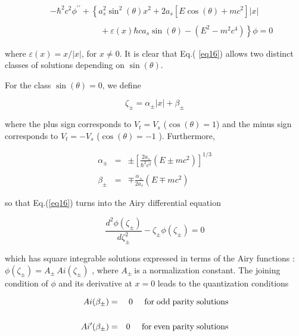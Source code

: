 \documentclass[a4paper,12pt,titlepage]{article}
\begin{document}
\smallskip

\begin{eqnarray}
&&-\hbar ^{2}c^{2}\phi ^{\prime \prime }+\left\{ a_{s}^{2}\sin ^{2}(\theta
)x^{2}+2a_{s}\left[ E\cos \left( \theta \right) +mc^{2}\right] |x|\right.
\nonumber \\
&&\qquad  \label{eq16} \\
&&\qquad \quad \quad \left. \qquad +\varepsilon (x)\hbar ca_{s}\sin (\theta
)-\left( E^{2}-m^{2}c^{4}\right) \right\} \phi =0  \nonumber
\end{eqnarray}

\noindent where $\varepsilon (x)=x/|x|$, for $x\neq 0$. It is clear that Eq.(%
\ref{eq16}) allows two distinct classes of solutions depending on $\sin
(\theta )$.

For the class $\sin (\theta )=0$, we define

\begin{equation}
\zeta _{\pm }=\alpha _{\pm }|x|+\beta _{\pm }  \label{eq17}
\end{equation}

\noindent where the plus sign corresponds to $V_{t}=V_{s}$ ($\cos (\theta
)=1 $) and the minus sign corresponds to $V_{t}=-V_{s}$ ($\cos (\theta )=-1$%
). Furthermore,

\begin{eqnarray}
\alpha _{\pm } &=&\pm \left[ \frac{2a_{s}}{\hbar ^{2}c^{2}}\left( E\pm
mc^{2}\right) \right] ^{1/3}  \nonumber \\
&&  \label{eq18} \\
\beta _{\pm } &=&\mp \frac{\alpha _{\pm }}{2a_{s}}\left( E\mp mc^{2}\right)
\nonumber
\end{eqnarray}

\noindent so that Eq.(\ref{eq16}) turns into the Airy differential equation

\begin{equation}
\frac{d^{2}\phi (\zeta _{\pm })}{d\zeta _{\pm }^{2}}-\zeta _{\pm }\phi
(\zeta _{\pm })=0  \label{eq19}
\end{equation}

\noindent which has square integrable solutions expressed in terms of the
Airy functions \cite{abr}: $\phi (\zeta _{\pm })=A_{\pm }\,Ai(\zeta _{\pm })$%
, where $A_{\pm }\mathcal{\ }$is a normalization constant. The joining
condition of $\phi $ and its derivative at $x=0$ leads to the quantization
conditions

\begin{eqnarray}
Ai(\beta _{\pm }) &=&0\;\;\;\;\;{\rm{ for \; odd \; parity \; solutions}}  \nonumber
\\
&&  \label{eq19a} \\
Ai^{\prime }(\beta _{\pm }) &=&0\;\;\;\;\;{\rm{ for \; even \; parity \; solutions}}
\nonumber
\end{eqnarray}
\end{document}
